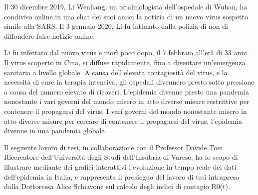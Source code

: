 
\noindent Il 30 dicembre 2019, Li Wenliang, un oftalmologista dell’ospedale di Wuhan, ha condiviso online in una chat dei suoi amici la notizia di un nuovo virus sospetto simile alla SARS.
Il 3 gennaio 2020, Li fu intimato dalla polizia di non di diffondere false notizie online.

\noindent Li fu infettato dal nuovo virus e morì poco dopo, il 7 febbraio all’età di 33 anni.
Il virus scoperto in Cina, si diffuse rapidamente, fino a diventare un'emergenza sanitaria a livello globale.
A causa dell’elevata contagiosità del virus, e la necessità di cure in terapia intensiva, gli ospedali divennero presto sotto pressione a causa del numero elevato di ricoveri.
L'epidemia divenne presto una pandemia nonostante i vari governi del mondo misero in atto diverse misure restrittive per contenere il propagarsi del virus.
\noindent I vari governi del mondo nonostante misero in atto diverse misure per cercare di contenere il propagarsi del virus, l'epidemia divenne in una pandemia globale.

\noindent Il seguente lavoro di tesi, in collaborazione con il Professor Davide Tosi Ricercatore dell’Università degli Studi dell’Insubria di Varese, ha lo scopo di illustrare mediante dei grafici interattivi l’evoluzione in tempo reale dei dati dell’epidemia in Italia, e rappresenta il prosieguo del lavoro di tesi intrapreso dalla Dottoressa Alice Schiavone sul calcolo degli indici di contagio R0(t)\cite{schiavone_tesi}.